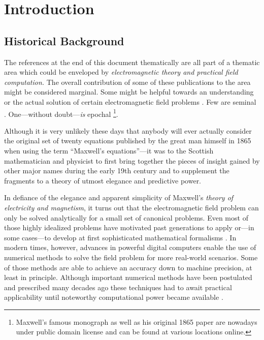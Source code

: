 \chapter{Introduction}
\label{ch:introduction}






\section{Historical Background}
\label{sec:history}

The references at the end of this document thematically are all part of a
thematic area which could be enveloped by
\emph{electromagnetic theory and practical field computation.}
The overall contribution of some of these publications to the area might be
considered marginal.
Some might be helpful towards an understanding or the actual solution of certain 
electromagnetic field problems \cite{Michalski2016b}.
Few are seminal \cite{Sommerfeld1909}.
One---without doubt---\emph{is} epochal
\cite{maxwell1873}\footnote{Maxwell's famous monograph \cite{maxwell1873} as
well as his original 1865 paper are nowadays under public domain license
and can be found at various locations online.}.

Although it is very unlikely these days that anybody will ever actually consider
the original set of twenty equations published by the great man himself in 1865
\cite{maxwell1865} when using the term
\enquote{Maxwell's equations}---it was to the Scottish mathematician and
physicist to first bring together the pieces of insight gained by other major
names during the early 19th century and to supplement the fragments to a theory
of utmost elegance and predictive power.

In defiance of the elegance and apparent simplicity of Maxwell's \emph{theory
of electricity and magnetism}, it turns out that the electromagnetic field
problem can only be solved analytically for a small set of canonical problems.
Even most of those highly idealized problems have motivated past generations to
apply or---in some cases---to develop at first sophisticated mathematical
formalisms \cite{Sommerfeld1964,Felsen1994}.
In modern times, however, advances in powerful digital computers enable the use
of numerical methods to solve the field problem for more real-world scenarios.
Some of those methods are able to achieve an accuracy down to machine precision,
at least in principle.
Although important numerical methods have been postulated and prescribed many
decades ago these techniques had to await practical applicability until
noteworthy computational power became available \cite{Harrington1993}.

